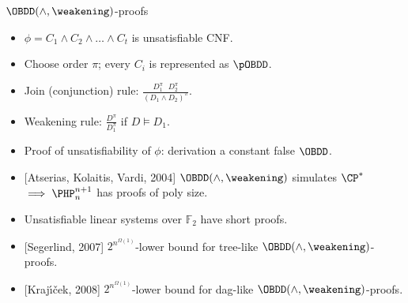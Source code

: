 \begin{frame}{$\OBDD(\land, \weakening)$-proofs}
    \begin{itemize}
        \item $\phi = C_1 \land C_2\land \dots \land C_t$ is unsatisfiable CNF.
        \item Choose order $\pi$; every $C_i$ is represented as $\pOBDD$.
        \item Join (conjunction) rule: $\frac{D_1^{\pi} ~~~ D_2^{\pi}} {(D_1\land D_2)^{\pi}}$.
        \item Weakening rule: $\frac{D^{\pi}}{D_1^{\pi}}$ if $D \models D_1$.
        \item Proof of unsatisfiability of $\phi$: derivation a constant false $\OBDD$.
        \pause
        \item{} [Atserias, Kolaitis, Vardi, 2004] $\OBDD(\land, \weakening)$ simulates $\CP^*$
            \pause $\implies \PHP^{n + 1}_n$ has proofs of poly size.
        \pause
        \item Unsatisfiable linear systems over $\mathbb{F}_2$ have short proofs.
        \pause
        \item{} [Segerlind, 2007] $2^{n^{\Omega(1)}}$-lower bound for tree-like $\OBDD(\land,
            \weakening)$-proofs.
        \item{} [Kraj{\'{\i}}{\v{c}}ek, 2008] $2^{n^{\Omega(1)}}$-lower bound for dag-like $\OBDD(\land,
            \weakening)$-proofs.
    \end{itemize}
\end{frame}


